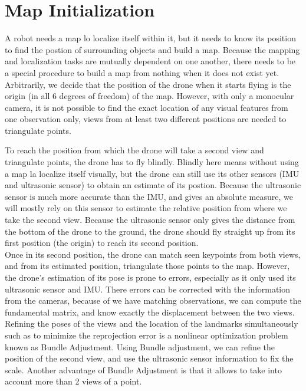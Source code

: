 \section{Map Initialization}
A robot needs a map lo localize itself within it, but it needs to know its position to find the postion of surrounding objects and build a map. Because the mapping and localization tasks are mutually dependent on one another, there needs to be a special procedure to build a map from nothing when it does not exist yet. Arbitrarily, we decide that the position of the drone when it starts flying is the origin (in all 6 degrees of freedom) of the map. However, with only a monocular camera, it is not possible to find the exact location of any visual features from one observation only, views from at least two different positions are needed to triangulate points.



To reach the position from which the drone will take a second view and triangulate points, the drone has to fly blindly. Blindly here means without using a map la localize itself visually, but the drone can still use its other sensors (IMU and ultrasonic sensor) to obtain an estimate of its postion. Because the ultrasonic sensor is much more accurate than the IMU, and gives an absolute measure, we will mostly rely on this sensor to estimate the relative position from where we take the second view. Because the ultrasonic sensor only gives the distance from the bottom of the drone to the ground, the drone should fly straight up from its first position (the origin) to reach its second position.\\
Once in its second position, the drone can match seen keypoints from both views, and from its estimated position, triangulate those points to the map. However, the drone's estimation of its pose is prone to errors, especially as it only used its ultrasonic sensor and IMU. There errors can be corrected with the information from the cameras, because of we have %
matching observations, we can compute the fundamental matrix, and know exactly the displacement between the two views. Refining the poses of the views and the location of the landmarks simultaneously such as to minimize the reprojection error is a nonlinear optimization problem known as Bundle Adjustment. Using Bundle adjustment, we can refine the position of the second view, and use the ultrasonic sensor information to fix the scale. Another advantage of Bundle Adjustment is that it allows to take into account more than 2 views of a point.
